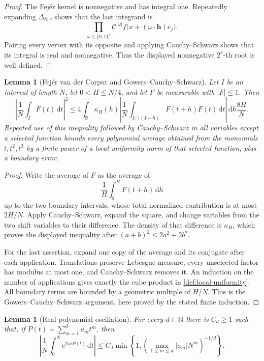 \documentclass[11pt]{article}
\newtheorem{lemma}[theorem]{Lemma}
\newcommand{\R}{\mathbb{R}}
\newcommand{\N}{\mathbb{N}}
\newcommand{\e}{\mathrm{e}}
\newcommand{\dd}{\,\mathrm{d}}
\newcommand{\abs}[1]{\left|#1\right|}
\begin{document}
	\begin{proof}
		The Fej\'er kernel is nonnegative and has integral one.  Repeatedly expanding
		\(\Delta_{h;v}\) shows that the last integrand is
		\[
		\prod_{\omega\in\{0,1\}^s}
		\mathcal C^{\abs\omega}
		f\bigl(x+(\omega\cdot\mathbf h)e_j\bigr).
		\]
		Pairing every vertex with its opposite and applying Cauchy--Schwarz shows that its integral is real and nonnegative.  Thus the displayed nonnegative \(2^s\)-th root is well defined.
	\end{proof}
	
	\begin{lemma}[Fej\'er van der Corput and Gowers--Cauchy--Schwarz]\label{lem:fejer-vdc}
		Let \(I\) be an interval of length \(N\), let \(0<H\leq N/4\), and let \(F\) be measurable with \(\abs F\leq1\).  Then
		\[
		\left|\frac1N\int_I F(t)\dd t\right|^2
		\leq
		4\int_\R\kappa_H(h)
		\left|\frac1N\int_{I\cap(I-h)}F(t+h)\overline{F(t)}\dd t\right|\dd h
		\frac{8H}{N}.
		\]
		Repeated use of this inequality followed by Cauchy--Schwarz in all variables except a selected function bounds every polynomial average obtained from the monomials \(t,t^2,t^3\) by a finite power of a local uniformity norm of that selected function, plus a boundary error.
	\end{lemma}
	
	\begin{proof}
		Write the average of \(F\) as the average of
		\[
		\frac1H\int_0^H F(t+h)\dd h
		\]
		up to the two boundary intervals, whose total normalized contribution is at most \(2H/N\).  Apply Cauchy--Schwarz, expand the square, and change variables from the two shift variables to their difference.  The density of that difference is \(\kappa_H\), which proves the displayed inequality after \((a+b)^2\leq2a^2+2b^2\).
		
		For the last assertion, expand one copy of the average and its conjugate after each application.  Translations preserve Lebesgue measure, every unselected factor has modulus at most one, and Cauchy--Schwarz removes it.  An induction on the number of applications gives exactly the cube product in \cref{def:local-uniformity}.  All boundary terms are bounded by a geometric multiple of \(H/N\).  This is the Gowers--Cauchy--Schwarz argument, here proved by the stated finite induction.
	\end{proof}
	
	\begin{lemma}[Real polynomial oscillation]\label{lem:real-polynomial-oscillation}
		For every \(d\in\N\) there is \(C_d\geq1\) such that, if
		\(P(t)=\sum_{m=1}^d a_mt^m\), then
		\[
		\left|\frac1N\int_0^N\e^{2\pi iP(t)}\dd t\right|
		\leq
		C_d\min\left\{1,
		\left(\max_{1\leq m\leq d}\abs{a_m}N^m\right)^{-1/d}\right\}.
		\]
	\end{lemma}
	
\end{document}
